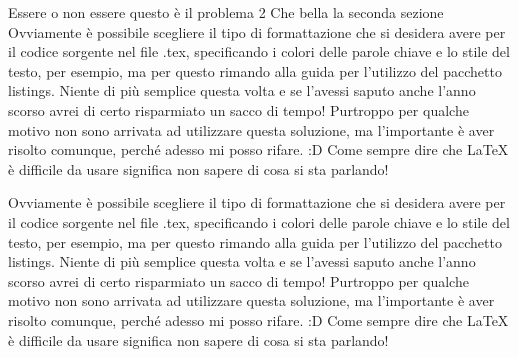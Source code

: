 \documentclass [a4paper,12pt,openany]{book}
\begin{document}
Essere o non essere questo è il problema 2
Che bella la seconda sezione
Ovviamente è possibile scegliere il tipo di formattazione che si desidera avere per il codice sorgente nel file .tex, specificando i colori delle parole chiave e lo stile del testo, per esempio, ma per questo rimando alla guida per l'utilizzo del pacchetto listings. Niente di più semplice questa volta e se l'avessi saputo anche l'anno scorso avrei di certo risparmiato un sacco di tempo! Purtroppo per qualche motivo non sono arrivata ad utilizzare questa soluzione, ma l'importante è aver risolto comunque, perché adesso mi posso rifare. :D Come sempre dire che LaTeX è difficile da usare significa non sapere di cosa si sta parlando!

Ovviamente è possibile scegliere il tipo di formattazione che si desidera avere per il codice sorgente nel file .tex, specificando i colori delle parole chiave e lo stile del testo, per esempio, ma per questo rimando alla guida per l'utilizzo del pacchetto listings. Niente di più semplice questa volta e se l'avessi saputo anche l'anno scorso avrei di certo risparmiato un sacco di tempo! Purtroppo per qualche motivo non sono arrivata ad utilizzare questa soluzione, ma l'importante è aver risolto comunque, perché adesso mi posso rifare. :D Come sempre dire che LaTeX è difficile da usare significa non sapere di cosa si sta parlando!




\end{document}
